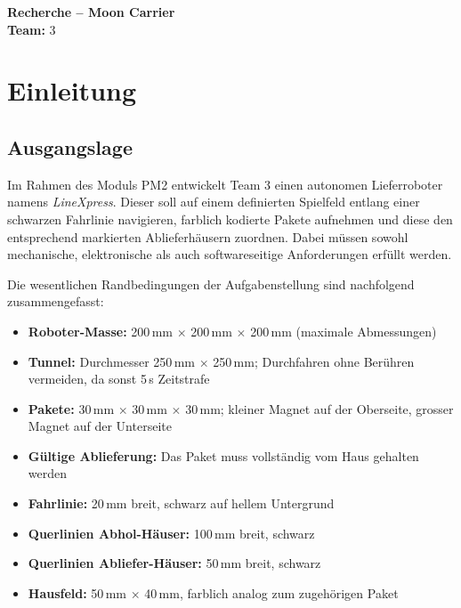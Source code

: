 \documentclass[12pt,a4paper]{article}
\begin{document}
	
	\begin{titlepage}
		\centering
		\vspace*{2cm}
		
		{\Large \textbf{Recherche -- Moon Carrier}}\\[1.5cm]
		
		\textbf{Team:} 3\\[0.3cm]
		
		\vfill
	\end{titlepage}
	
	\tableofcontents
	\newpage
	
	\section{Einleitung}
	
	\subsection{Ausgangslage}
	
	Im Rahmen des Moduls PM2 entwickelt Team 3 einen autonomen Lieferroboter namens \textit{LineXpress}. Dieser soll auf einem definierten Spielfeld entlang einer schwarzen Fahrlinie navigieren, farblich kodierte Pakete aufnehmen und diese den entsprechend markierten Ablieferhäusern zuordnen. Dabei müssen sowohl mechanische, elektronische als auch softwareseitige Anforderungen erfüllt werden.
	
	Die wesentlichen Randbedingungen der Aufgabenstellung sind nachfolgend zusammengefasst:
	
	\begin{itemize}
		\item \textbf{Roboter-Masse:} 200\,mm $\times$ 200\,mm $\times$ 200\,mm (maximale Abmessungen)
		\item \textbf{Tunnel:} Durchmesser 250\,mm $\times$ 250\,mm; Durchfahren ohne Berühren vermeiden, da sonst 5\,s Zeitstrafe
		\item \textbf{Pakete:} 30\,mm $\times$ 30\,mm $\times$ 30\,mm; kleiner Magnet auf der Oberseite, grosser Magnet auf der Unterseite
		\item \textbf{Gültige Ablieferung:} Das Paket muss vollständig vom Haus gehalten werden
		\item \textbf{Fahrlinie:} 20\,mm breit, schwarz auf hellem Untergrund
		\item \textbf{Querlinien Abhol-Häuser:} 100\,mm breit, schwarz
		\item \textbf{Querlinien Abliefer-Häuser:} 50\,mm breit, schwarz
		\item \textbf{Hausfeld:} 50\,mm $\times$ 40\,mm, farblich analog zum zugehörigen Paket
	\end{itemize}
	
\end{document}
